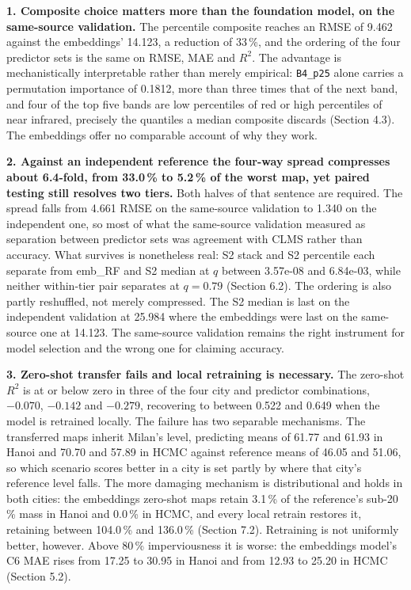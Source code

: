 \documentclass[11pt,a4paper]{article}
\newcommand{\Rsq}{$R^2$}
\begin{document}
\textbf{1. Composite choice matters more than the foundation model, on the same-source
validation.} The percentile composite reaches an RMSE of 9.462 against the
embeddings' 14.123, a reduction of 33\,\%, and the ordering of the four predictor
sets is the same on RMSE, MAE and \Rsq{}. The advantage is mechanistically
interpretable rather than merely empirical: \texttt{B4\_p25} alone carries a permutation
importance of 0.1812, more than three times that of the next band, and four of
the top five bands are low percentiles of red or high percentiles of near
infrared, precisely the quantiles a median composite discards (Section 4.3).
The embeddings offer no comparable account of why they work.

\textbf{2. Against an independent reference the four-way spread compresses about
6.4-fold, from 33.0\,\% to 5.2\,\% of the worst map, yet paired testing still
resolves two tiers.} Both halves of that sentence are required. The spread
falls from 4.661 RMSE on the same-source validation to 1.340 on the independent
one, so most of what the same-source validation measured as separation between
predictor sets was agreement with CLMS rather than accuracy. What survives is
nonetheless real: S2 stack and S2 percentile each separate from emb\_RF and S2
median at $q$ between 3.57e-08 and 6.84e-03, while neither within-tier pair
separates at $q = 0.79$ (Section 6.2). The ordering is also partly reshuffled, not
merely compressed. The S2 median is last on the independent validation at
25.984 where the embeddings were last on the same-source one at 14.123. The
same-source validation remains the right instrument for model selection and the
wrong one for claiming accuracy.

\textbf{3. Zero-shot transfer fails and local retraining is necessary.} The zero-shot
\Rsq{} is at or below zero in three of the four city and predictor combinations,
$-0.070$, $-0.142$ and $-0.279$, recovering to between 0.522 and 0.649 when the model
is retrained locally. The failure has two separable mechanisms. The transferred
maps inherit Milan's level, predicting means of 61.77 and 61.93 in Hanoi and
70.70 and 57.89 in HCMC against reference means of 46.05 and 51.06, so which
scenario scores better in a city is set partly by where that city's reference
level falls. The more damaging mechanism is distributional and holds in both
cities: the embeddings zero-shot maps retain 3.1\,\% of the reference's sub-20\,\%
mass in Hanoi and 0.0\,\% in HCMC, and every local retrain restores it, retaining
between 104.0\,\% and 136.0\,\% (Section 7.2). Retraining is not uniformly better,
however. Above 80\,\% imperviousness it is worse: the embeddings model's C6 MAE
rises from 17.25 to 30.95 in Hanoi and from 12.93 to 25.20 in HCMC (Section 5.2).
\end{document}
